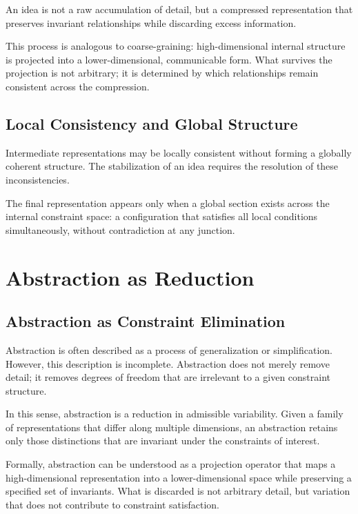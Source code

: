 \documentclass[11pt]{article}
\theoremstyle{plain}
\theoremstyle{definition}
\theoremstyle{remark}
\begin{document}
An idea is not a raw accumulation of detail, but a compressed representation
that preserves invariant relationships while discarding excess information.

This process is analogous to coarse-graining: high-dimensional internal
structure is projected into a lower-dimensional, communicable form. What
survives the projection is not arbitrary; it is determined by which
relationships remain consistent across the compression.

\subsection{Local Consistency and Global Structure}

Intermediate representations may be locally consistent without forming a
globally coherent structure. The stabilization of an idea requires the
resolution of these inconsistencies.

The final representation appears only when a global section exists across
the internal constraint space: a configuration that satisfies all local
conditions simultaneously, without contradiction at any junction.

\section{Abstraction as Reduction}

\subsection{Abstraction as Constraint Elimination}

Abstraction is often described as a process of generalization or
simplification. However, this description is incomplete. Abstraction
does not merely remove detail; it removes degrees of freedom that are
irrelevant to a given constraint structure.

In this sense, abstraction is a reduction in admissible variability.
Given a family of representations that differ along multiple dimensions,
an abstraction retains only those distinctions that are invariant under
the constraints of interest.

Formally, abstraction can be understood as a projection operator that
maps a high-dimensional representation into a lower-dimensional space
while preserving a specified set of invariants. What is discarded is not
arbitrary detail, but variation that does not contribute to constraint
satisfaction.
\end{document}
